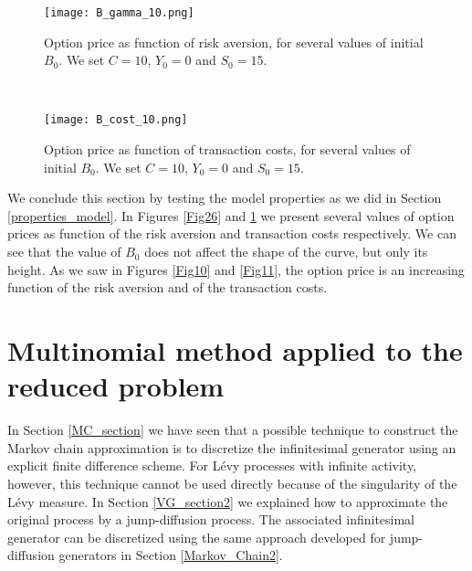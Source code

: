 \begin{figure}[t!]
 \begin{minipage}[b]{0.5\linewidth}
   \centering
   \texttt{[image: B\_gamma\_10.png]}
   \caption{Option price as function of risk aversion, for several values of initial $B_0$. We set $C=10$, $Y_0=0$ and $S_0=15$.}
   \label{Fig26} 
 \end{minipage}
 \ \hspace{2mm} \hspace{3mm} \
 \begin{minipage}[b]{0.5\linewidth}
   \texttt{[image: B\_cost\_10.png]}
   \caption{Option price as function of transaction costs, for several values of initial $B_0$. We set $C=10$, $Y_0=0$ and $S_0=15$.}
   \label{Fig25}
 \end{minipage}
\end{figure}  

We conclude this section by testing the model properties as we did in Section \ref{properties_model}. 
In Figures \ref{Fig26} and \ref{Fig25} we present several values of option prices as function of the risk aversion and transaction costs respectively.  
We can see that the value of $B_0$ does not affect the shape of the curve, but only its height. 
As we saw in Figures \ref{Fig10} and \ref{Fig11}, the option price is an increasing function of the risk aversion and of the transaction costs.


\section{Multinomial method applied to the reduced problem}\label{multinomial_section}

In Section \ref{MC_section} we have seen that a possible technique to construct the Markov chain approximation is to discretize the infinitesimal generator
using an explicit finite difference scheme.
For Lévy processes with infinite activity, however, this technique cannot be used directly because of the singularity of the Lévy measure.
In Section \ref{VG_section2} we explained how to approximate the original process by a jump-diffusion process. 
The associated infinitesimal generator can be discretized using the same approach developed for jump-diffusion generators in Section \ref{Markov_Chain2}.

